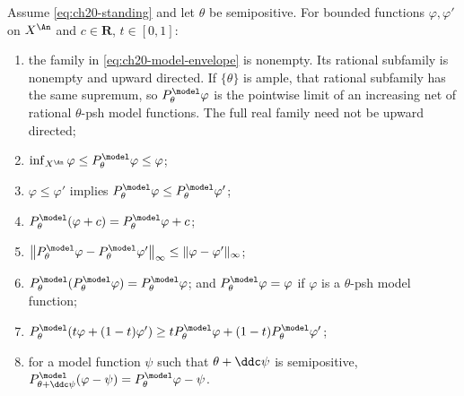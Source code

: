 \begin{theorem}
\label{thm:ch20-model-envelope}
Assume \eqref{eq:ch20-standing} and let \(\theta\) be semipositive.  For
bounded functions \(\varphi,\varphi'\) on \(X^{\An}\) and \(c\in\mathbf R\),
\(t\in[0,1]\):
\begin{enumerate}
\item\label{itm:ch20-env:directed} the family in
 \eqref{eq:ch20-model-envelope} is nonempty.  Its rational subfamily is
 nonempty and upward directed.  If \(\{\theta\}\) is ample, that
 rational subfamily has the same supremum, so
 \(P^{\model}_\theta\varphi\) is the pointwise limit of an increasing
 net of rational \(\theta\)-psh model functions.  The full real family
 need not be upward directed;
\item\label{itm:ch20-env:bounds}
 \(\inf_{X^{\An}}\varphi\leq P^{\model}_\theta\varphi\leq\varphi\);
\item\label{itm:ch20-env:monotone} \(\varphi\leq\varphi'\) implies
 \(P^{\model}_\theta\varphi\leq P^{\model}_\theta\varphi'\);
\item\label{itm:ch20-env:translate}
 \(P^{\model}_\theta(\varphi+c)=P^{\model}_\theta\varphi+c\);
\item\label{itm:ch20-env:lipschitz}
 \(\bigl\|P^{\model}_\theta\varphi-P^{\model}_\theta\varphi'\bigr\|_\infty
   \leq\|\varphi-\varphi'\|_\infty\);
\item\label{itm:ch20-env:idem}
 \(P^{\model}_\theta(P^{\model}_\theta\varphi)=P^{\model}_\theta\varphi\);
 and \(P^{\model}_\theta\varphi=\varphi\) if \(\varphi\) is a
 \(\theta\)-psh model function;
\item\label{itm:ch20-env:concave}
 \(P^{\model}_\theta(t\varphi+(1-t)\varphi')
   \geq tP^{\model}_\theta\varphi+(1-t)P^{\model}_\theta\varphi'\);
\item\label{itm:ch20-env:reference} for a model function \(\psi\) such that
 \(\theta+\ddc\psi\) is semipositive,
 \(P^{\model}_{\theta+\ddc\psi}(\varphi-\psi)
    =P^{\model}_\theta\varphi-\psi\).
\end{enumerate}
\end{theorem}


